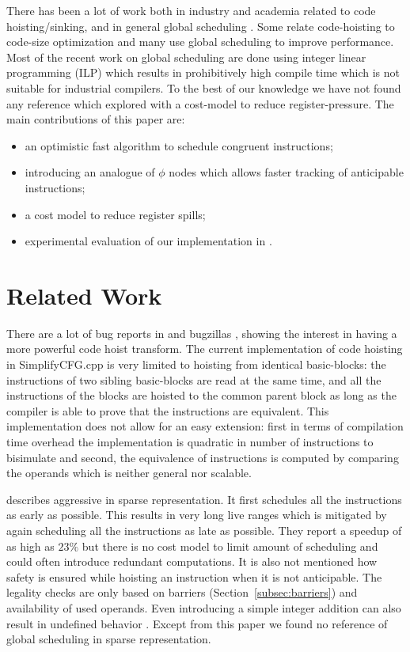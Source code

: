 \documentclass[sigplan,10pt,review,anonymous]{acmart}\settopmatter{printfolios=true,printccs=false,printacmref=false}
\begin{document}
There has been a lot of work both in industry and academia related to code
hoisting/sinking, and in general global scheduling \cite{click1995global}. Some
relate code-hoisting to code-size optimization \cite{rosen1988global} and many
\cite{barany2013, shobaki2013} use global scheduling to improve
performance. Most of the recent work on global scheduling are done using integer
linear programming (ILP) which results in prohibitively high compile time which
is not suitable for industrial compilers. To the best of our knowledge we have
not found any reference which explored \gcm{} with a cost-model to reduce
register-pressure. The main contributions of this paper are:
\begin{itemize}[leftmargin=*,topsep=0pt]
\item an optimistic fast algorithm to schedule congruent instructions;
\item introducing an analogue of $\phi$ nodes which allows faster tracking of
  anticipable instructions;
\item a cost model to reduce register spills;
\item experimental evaluation of our implementation in \LLVM{}.
\end{itemize}


\section{Related Work}
There are a lot of bug reports in \GCC{} and \LLVM{} bugzillas
\cite{GCCCodeHoistingBugs, LLVMCodeHoistingBugs}, showing the interest in having
a more powerful code hoist transform.  The current \LLVM{} implementation of
code hoisting in SimplifyCFG.cpp is very limited to hoisting from identical
basic-blocks: the instructions of two sibling basic-blocks are read at the same
time, and all the instructions of the blocks are hoisted to the common parent
block as long as the compiler is able to prove that the instructions are
equivalent.  This implementation does not allow for an easy extension: first in
terms of compilation time overhead the implementation is quadratic in number of
instructions to bisimulate and second, the equivalence of instructions is
computed by comparing the operands which is neither general nor scalable.

\citet{click1995global} describes aggressive \gcm{} in sparse representation. It
first schedules all the instructions as early as possible. This results in very
long live ranges which is mitigated by again scheduling all the instructions as
late as possible. They report a speedup of as high as $23\%$ but there is no
cost model to limit amount of scheduling and could often introduce redundant
computations. It is also not mentioned how safety is ensured while hoisting an
instruction when it is not anticipable. The legality checks are only based on
barriers (Section~\ref{subsec:barriers}) and availability of used operands. Even
introducing a simple integer addition can also result in undefined behavior
\cite{undef}.  Except from this paper we found no reference of global scheduling
in sparse representation.
\end{document}
